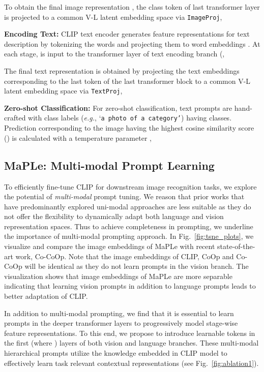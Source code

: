 \documentclass[10pt,twocolumn,letterpaper]{article}
\def\eg{\emph{e.g.}\xspace}
\begin{document}
To obtain the final image representation , the class token  of last transformer layer  is projected to a common V-L latent embedding space via \texttt{ImageProj}, 

\textbf{Encoding Text:} CLIP text encoder generates feature representations for text description by tokenizing the words and projecting them to  word embeddings 
.
At each stage,  is input to the  transformer layer of text encoding branch (,

The final text representation  is obtained by projecting the text embeddings corresponding to the last token of the last transformer block  to a common V-L latent embedding space via \texttt{TextProj},
 
\textbf{Zero-shot Classification:}
For zero-shot classification, text prompts are hand-crafted with class labels  (\eg, ‘\texttt{a photo of a category’}) having  classes. Prediction  corresponding to the image  having the highest cosine similarity score () is calculated with a temperature parameter ,






\subsection{MaPLe: \textbf{M}ulti-mod\textbf{a}l \textbf{P}rompt \textbf{Le}arning}
\noindent To efficiently fine-tune CLIP for downstream image recognition tasks, we explore the potential of \textit{multi-modal} prompt tuning.
We reason that prior works that have predominantly explored uni-modal approaches are less suitable as they do not offer the flexibility to dynamically adapt both language and vision representation spaces. Thus to achieve completeness in prompting, we underline the importance of multi-modal prompting approach. In Fig.~\ref{fig:tsne_plots}, we visualize and compare the image embeddings of MaPLe with recent state-of-the-art work, Co-CoOp. Note that the image embeddings of CLIP, CoOp and Co-CoOp will be identical as they do not learn prompts in the vision branch. The visualization shows that image embeddings of MaPLe are more separable indicating that learning vision prompts in addition to language prompts leads to better adaptation of CLIP.

In addition to multi-modal prompting, we find that it is essential to learn prompts in the deeper transformer layers to progressively model stage-wise feature representations. To this end, we propose to introduce learnable tokens in the first  (where ) layers of both vision and language branches. These multi-modal hierarchical prompts utilize the knowledge embedded in CLIP model to effectively learn task relevant contextual representations (see Fig.~\ref{fig:ablation1}).
\end{document}
